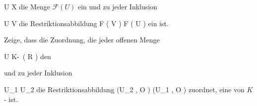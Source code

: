 \mavergleichskette
{\vergleichskette
{U
}
{ \subseteq }{ X
}
{  }{
}
{    }{
}
{   }{
}
}
{}{}{}
die Menge ${ \mathcal  F   }  \left(   U   \right)$ ein
und zu jeder Inklusion

\mavergleichskette
{\vergleichskette
{U
}
{ \subseteq }{ V
}
{  }{
}
{    }{
}
{   }{
}
}
{}{}{}
die Restriktionsabbildung
 { { \mathcal  F   }  \left(   V   \right) } { { \mathcal  F   }  \left(   U   \right)
} {}
ein
ist.







{}
{





Zeige, dass die Zuordnung, die jeder offenen Menge

\mavergleichskette
{\vergleichskette
{U
}
{ \subseteq }{ K\!-\!\, \left(   R   \right)
}
{  }{
}
{    }{
}
{   }{
}
}
{}{}{}
den

 und zu jeder Inklusion

\mavergleichskette
{\vergleichskette
{U_1
}
{ \subseteq }{ U_2
}
{  }{
}
{    }{
}
{   }{
}
}
{}{}{}
die Restriktionsabbildung
 {} {}
\maabbdisp {} { \Gamma (U_2 , {\mathcal O} ) } { \Gamma (U_1 , {\mathcal O} )
} {}
zuordnet, eine
von
$K$-
ist.





}
{} {}







